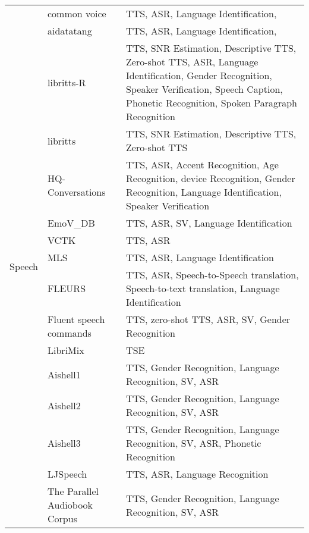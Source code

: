 \begin{longtable}{p{2cm}p{6cm}p{6cm}}
\multirow{22}{*}{Speech} & common voice \cite{ardila2019common}  & TTS, ASR, Language Identification,  \\  
                         & aidatatang \cite{aidatatang200zh}  & TTS,  ASR, Language Identification, \\  
                         & libritts-R \cite{koizumi2023librittsr}  & TTS, SNR Estimation, Descriptive TTS, Zero-shot TTS,  ASR, Language Identification, Gender Recognition, Speaker Verification, Speech Caption, Phonetic Recognition, Spoken Paragraph Recognition \\  
                         & libritts \cite{zen2019libritts}  & TTS, SNR Estimation, Descriptive TTS, Zero-shot TTS \\  
                         & HQ-Conversations \cite{xia2024iscslp}  & TTS, ASR, Accent Recognition, Age Recognition, device Recognition, Gender Recognition, Language Identification, Speaker Verification \\  
                         & EmoV\_DB \cite{adigwe2018emotional}  & TTS, ASR, SV, Language Identification \\  
                         & VCTK \cite{veaux2017cstr}  & TTS, ASR \\  
                         & MLS \cite{Pratap2020MLSAL}  & TTS, ASR, Language Identification \\  
                         & FLEURS \cite{conneau2023fleurs}  & TTS, ASR, Speech-to-Speech translation, Speech-to-text translation, Language Identification \\  
                         & Fluent speech commands \cite{lugosch2019speech}  & TTS, zero-shot TTS, ASR, SV, Gender Recognition \\  
                         & LibriMix \cite{cosentino2020librimix}  & TSE \\  
                         & Aishell1 \cite{bu2017aishell}  & TTS, Gender Recognition, Language Recognition, SV, ASR \\  
                         & Aishell2 \cite{du2018aishell}  & TTS, Gender Recognition, Language Recognition, SV, ASR  \\  
                         & Aishell3 \cite{shi2020aishell}  & TTS,  Gender Recognition, Language Recognition, SV, ASR, Phonetic Recognition  \\  
                         & LJSpeech \cite{ljspeech17}  & TTS, ASR, Language Recognition \\  
                         & The Parallel Audiobook Corpus \cite{pacorpus18}  & TTS, Gender Recognition, Language Recognition, SV, ASR  \\  

\end{longtable}
